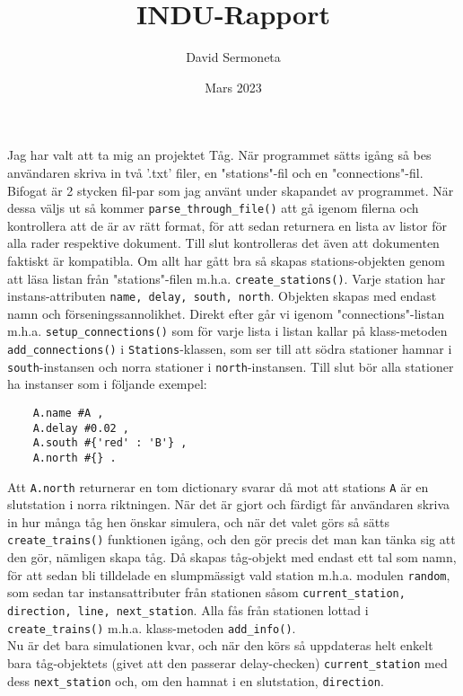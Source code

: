 \documentclass{article}
\title{INDU-Rapport}
\author{David Sermoneta}
\date{Mars 2023}
\begin{document}
\maketitle
\noindent Jag har valt att ta mig an projektet Tåg. När programmet sätts igång så bes användaren skriva in två '.txt' filer, en "stations"-fil och en "connections"-fil. Bifogat är 2 stycken fil-par som jag använt under skapandet av programmet. När dessa väljs ut så kommer \verb|parse_through_file()| att gå igenom filerna och kontrollera att de är av rätt format, för att sedan returnera en lista av listor för alla rader respektive dokument. Till slut kontrolleras det även att dokumenten faktiskt är kompatibla.  
Om allt har gått bra så skapas stations-objekten genom att läsa listan från "stations"-filen m.h.a. \verb|create_stations()|. Varje station har instans-attributen \verb|name, delay, south, north|.
Objekten skapas med endast namn och förseningssannolikhet. Direkt efter går vi igenom "connections"-listan m.h.a. \verb|setup_connections()| som för varje lista i listan kallar på klass-metoden \verb|add_connections()| i \verb|Stations|-klassen, som ser till att södra stationer hamnar i \verb|south|-instansen och norra stationer i \verb|north|-instansen. 
Till slut bör alla stationer ha instanser som i följande exempel: \begin{verbatim}
    A.name #A ,
    A.delay #0.02 ,
    A.south #{'red' : 'B'} ,
    A.north #{} .
\end{verbatim}
Att \verb|A.north| returnerar en tom dictionary svarar då mot att stations \verb|A| är en slutstation i norra riktningen. 
När det är gjort och färdigt får användaren skriva in hur många tåg hen önskar simulera, och när det valet görs så sätts \verb|create_trains()| funktionen igång, och den gör precis det man kan tänka sig att den gör, nämligen skapa tåg. Då skapas tåg-objekt med endast ett tal som namn, för att sedan bli tilldelade en slumpmässigt vald station m.h.a. modulen \verb|random|, som sedan tar instansattributer från stationen såsom \verb|current_station, direction, line, next_station|. Alla fås från stationen lottad i \verb|create_trains()| m.h.a. klass-metoden \verb|add_info()|. 
\\

\noindent Nu är det bara simulationen kvar, och när den körs så uppdateras helt enkelt bara tåg-objektets (givet att den passerar delay-checken) \verb|current_station| med dess \verb|next_station| och, om den hamnat i en slutstation, \verb|direction|. 
\\
\end{document}
